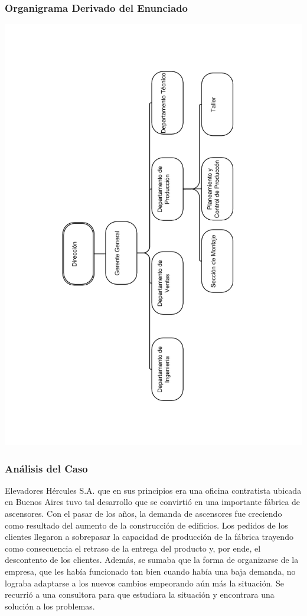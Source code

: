\documentclass[a4paper,10pt,titlepage]{article}
\begin{document}
\subsubsection{Organigrama Derivado del Enunciado}
  \begin{center}
  \includegraphics[width=150mm]{./herculesBN.png}
  \end{center}
\newpage

\subsubsection{An\'alisis del Caso}

		\indent Elevadores H\'ercules S.A. que en sus principios era una oficina contratista ubicada en Buenos Aires tuvo tal desarrollo que se convirti\'o        en una importante f\'abrica de ascensores. Con el pasar de los a\~nos, la demanda de ascensores fue creciendo como resultado del aumento de       la construcci\'on de edificios. Los pedidos de los clientes llegaron a sobrepasar la capacidad de producci\'on de la f\'abrica trayendo como       consecuencia el retraso de la entrega del producto y, por ende, el descontento de los clientes. Adem\'as, se sumaba que la forma de       organizarse de la empresa, que les hab\'ia funcionado tan bien cuando hab\'ia una baja demanda, no lograba adaptarse a los nuevos cambios      empeorando a\'un m\'as la situaci\'on. Se recurri\'o a una consultora para que estudiara la situaci\'on y encontrara una soluci\'on a los problemas. \\ \\
\end{document}
